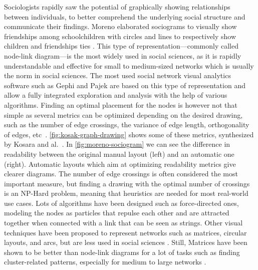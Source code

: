 Sociologists rapidly saw the potential of graphically showing relationships between individuals, to better comprehend the underlying social structure and communicate their findings.
Moreno elaborated sociograms to visually show friendships among schoolchildren with circles and lines to respectively show children and friendships ties \cite{morenoWhoShallSurvive1934}.
This type of representation---commonly called node-link diagram---is the most widely used in social sciences, as it is rapidly understandable and effective for small to medium-sized networks which is usually the norm in social sciences.
The most used social network visual analytics software such as Gephi \cite{Gephi} and Pajek \cite{mrvarAnalysisVisualizationLarge2016} are based on this type of representation and allow a fully integrated exploration and analysis with the help of various algorithms.
Finding an optimal placement for the nodes is however not that simple as several metrics can be optimized depending on the desired drawing, such as the number of edge crossings, the variance of edge length, orthogonality of edges, etc~\cite{cristofoliPrincipesUsagesDessins, kosakAutomatingLayoutNetwork1994}. \autoref{fig:kosak-graph-drawing} shows some of these metrics, synthesized by Kosara and al.~\cite{kosakAutomatingLayoutNetwork1994}.
In \autoref{fig:moreno-sociogram} we can see the difference in readability between the original manual layout (left) and an automatic one (right).
Automatic layouts which aim at optimizing readability metrics give clearer diagrams.
The number of edge crossings is often considered the most important measure, but finding a drawing with the optimal number of crossings is an NP-Hard problem, meaning that heuristics are needed for most real-world use cases.
Lots of algorithms have been designed such as force-directed ones, modeling the nodes as particles that repulse each other and are attracted together when connected with a link that can be seen as strings.
Other visual techniques have been proposed to represent networks such as matrices, circular layouts, and arcs, but are less used in social sciences \cite{mcguffinSimpleAlgorithmsNetwork2012}.
Still, Matrices have been shown to be better than node-link diagrams for a lot of tasks such as finding cluster-related patterns, especially for medium to large networks \cite{ghoniemComparisonReadabilityGraphs2004}.

